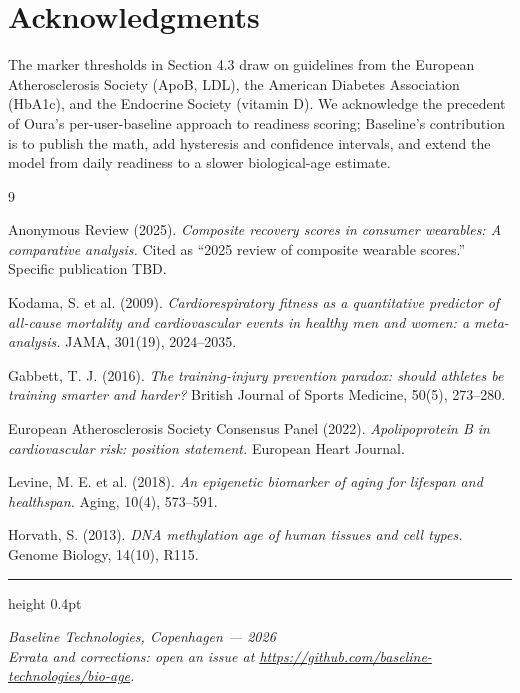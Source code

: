 \documentclass[10pt, a4paper]{article}
\begin{document}
\section*{Acknowledgments}

The marker thresholds in Section 4.3 draw on guidelines from the European Atherosclerosis Society (ApoB, LDL), the American Diabetes Association (HbA1c), and the Endocrine Society (vitamin D). We acknowledge the precedent of Oura's per-user-baseline approach to readiness scoring; Baseline's contribution is to publish the math, add hysteresis and confidence intervals, and extend the model from daily readiness to a slower biological-age estimate.

\begin{thebibliography}{9}

Anonymous Review (2025).
\textit{Composite recovery scores in consumer wearables: A comparative analysis.}
Cited as ``2025 review of composite wearable scores.'' Specific publication TBD.

Kodama, S. et al. (2009).
\textit{Cardiorespiratory fitness as a quantitative predictor of all-cause mortality and cardiovascular events in healthy men and women: a meta-analysis.}
JAMA, 301(19), 2024--2035.

Gabbett, T. J. (2016).
\textit{The training-injury prevention paradox: should athletes be training smarter and harder?}
British Journal of Sports Medicine, 50(5), 273--280.

European Atherosclerosis Society Consensus Panel (2022).
\textit{Apolipoprotein B in cardiovascular risk: position statement.}
European Heart Journal.

Levine, M. E. et al. (2018).
\textit{An epigenetic biomarker of aging for lifespan and healthspan.}
Aging, 10(4), 573--591.

Horvath, S. (2013).
\textit{DNA methylation age of human tissues and cell types.}
Genome Biology, 14(10), R115.

\end{thebibliography}

\vspace{1em}
{\color{rule}\hrule height 0.4pt}
\vspace{0.5em}

\begin{center}
\color{muted}\footnotesize\itshape
Baseline Technologies, Copenhagen --- 2026 \\
Errata and corrections: open an issue at \url{https://github.com/baseline-technologies/bio-age}.
\end{center}
\end{document}
